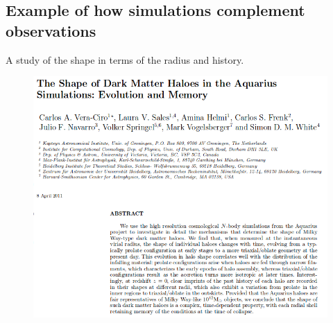 \documentclass[xcolor=dvipsnames]{beamer}
\begin{document}
\subsection{Example of how simulations complement observations}
\begin{frame}

A study of the shape in terms of the radius and history.

\begin{figure}[c]
\includegraphics[width=0.8\linewidth]{./pics/veraCiroAquarius.png}
\end{figure}

\end{frame}

\end{document}
